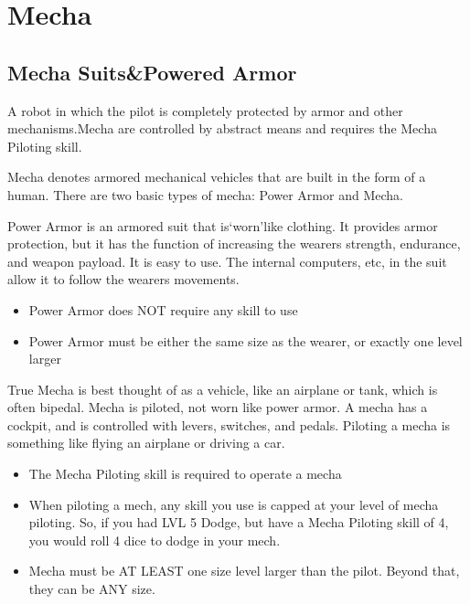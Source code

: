\documentclass[twoside]{book}
\begin{document}
\begin{multicols}{2}
    
\end{multicols}
  
    

\chapter{Mecha}
    
    

\section{Mecha Suits\&Powered Armor}
    
    {  
    A robot in which the pilot is completely protected by armor and other mechanisms.Mecha are controlled by abstract means and requires the Mecha Piloting skill.
    }
  
    {  
    Mecha denotes armored mechanical vehicles that are built in the form of a human. There are two basic types of mecha: Power Armor and Mecha.
    }
  
    {  
    Power Armor is an armored suit that is`worn'like clothing. It provides armor protection, but it has the function of increasing the wearers strength, endurance, and weapon payload. It is easy to use. The internal computers, etc, in the suit allow it to follow the wearers movements.
    }
  
\begin{itemize}
      
  \item Power Armor does NOT require any skill to use
  \item Power Armor must be either the same size as the wearer, or exactly one level larger
\end{itemize}
  
    {  
    True Mecha is best thought of as a vehicle, like an airplane or tank, which is often bipedal. Mecha is piloted, not worn like power armor. A mecha has a cockpit, and is controlled with levers, switches, and pedals. Piloting a mecha is something like flying an airplane or driving a car.
    }
  
\begin{itemize}
      
  \item The Mecha Piloting skill is required to operate a mecha
  \item When piloting a mech, any skill you use is capped at your level of mecha piloting. So, if you had LVL 5 Dodge, but have a Mecha Piloting skill of 4, you would roll 4 dice to dodge in your mech.
  \item Mecha must be AT LEAST one size level larger than the pilot. Beyond that, they can be ANY size.
\end{itemize}
  
\end{document}
